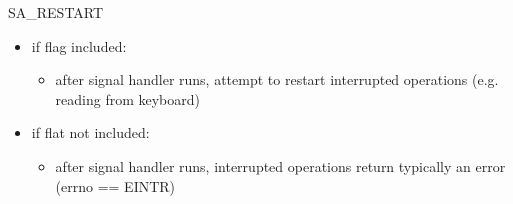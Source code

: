 
\begin{frame}{SA\_RESTART}
    \begin{itemize}
    \item if flag included:
        \begin{itemize}
        \item after signal handler runs, attempt to restart interrupted operations
                (e.g. reading from keyboard)
        \end{itemize}
    \item if flat not included:
        \begin{itemize}
        \item after signal handler runs, interrupted operations return
            typically an error (errno == EINTR)
        \end{itemize}
    \end{itemize}
\end{frame}
